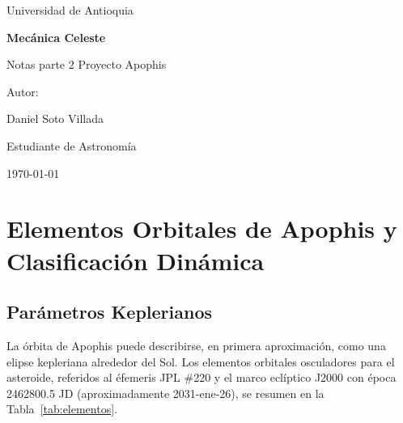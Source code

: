 \documentclass[a4paper]{article}
\begin{document}
\begin{titlepage}
  \centering
  {\Large Universidad de Antioquia\par}
  \vspace{2cm}
  {\huge\bfseries Mecánica Celeste\par}
  \vspace{0.4cm}
  {\Large Notas parte 2 Proyecto Apophis\par}
  \vspace{2.5cm}
  {\large Autor:\par}
  \vspace{0.2cm}
  {\large Daniel Soto Villada\par}
  {\large Estudiante de Astronomía\par}
  \vfill
  {\large \today\par}
\end{titlepage}

\newpage
\tableofcontents
\newpage

\section{Elementos Orbitales de Apophis y Clasificación Dinámica}

\subsection{Parámetros Keplerianos}

La órbita de Apophis puede describirse, en primera aproximación, como una elipse kepleriana alrededor del Sol. Los elementos orbitales osculadores para el asteroide, referidos al éfemeris JPL \#220 y el marco eclíptico J2000 con época 2462800.5 JD (aproximadamente 2031-ene-26), se resumen en la Tabla~\ref{tab:elementos}.
\end{document}
